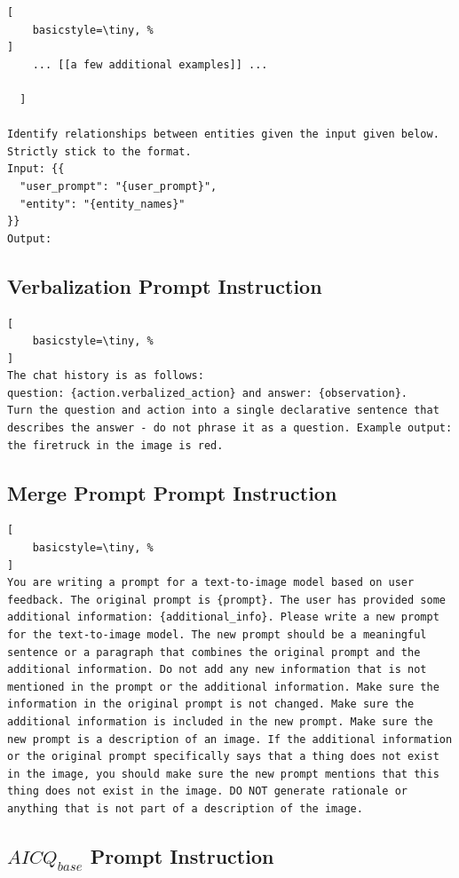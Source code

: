 \begin{lstlisting}[
    basicstyle=\tiny, %
]
    ... [[a few additional examples]] ...

  ]

Identify relationships between entities given the input given below. Strictly stick to the format.
Input: {{
  "user_prompt": "{user_prompt}",
  "entity": "{entity_names}"
}}
Output: 
\end{lstlisting}

\subsection{Verbalization Prompt Instruction} \label{ssec:qna_verbal}
\begin{lstlisting}[
    basicstyle=\tiny, %
]
The chat history is as follows:
question: {action.verbalized_action} and answer: {observation}.
Turn the question and action into a single declarative sentence that describes the answer - do not phrase it as a question. Example output: the firetruck in the image is red.
\end{lstlisting}

\subsection{Merge Prompt Prompt Instruction} \label{ssec:merge_prompt}
\begin{lstlisting}[
    basicstyle=\tiny, %
]
You are writing a prompt for a text-to-image model based on user feedback. The original prompt is {prompt}. The user has provided some additional information: {additional_info}. Please write a new prompt for the text-to-image model. The new prompt should be a meaningful sentence or a paragraph that combines the original prompt and the additional information. Do not add any new information that is not mentioned in the prompt or the additional information. Make sure the information in the original prompt is not changed. Make sure the additional information is included in the new prompt. Make sure the new prompt is a description of an image. If the additional information or the original prompt specifically says that a thing does not exist in the image, you should make sure the new prompt mentions that this thing does not exist in the image. DO NOT generate rationale or anything that is not part of a description of the image.
\end{lstlisting}

\subsection{$AICQ_{base}$ Prompt Instruction} \label{ssec:monolithic_agent_prompt}

